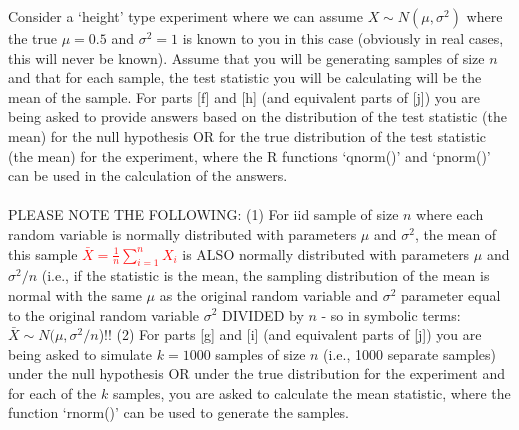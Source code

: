 \documentclass[letterpaper, 11pt]{article}
\begin{document}
Consider a `height' type experiment where we can assume $X \sim N(\mu, \sigma^2)$ where the true $\mu=0.5$ and $\sigma^2=1$ is known to you in this case (obviously in real cases, this will never be known).  Assume that you will be generating samples of size $n$ and that for each sample, the test statistic you will be calculating will be the mean of the sample.  For parts [f] and [h] (and equivalent parts of [j]) you are being asked to provide answers based on the distribution of the test statistic (the mean) for the null hypothesis OR for the true distribution of the test statistic (the mean) for the experiment, where the R functions `qnorm()' and `pnorm()' can be used in the calculation of the answers.
\\
\\
PLEASE NOTE THE FOLLOWING: (1) For iid sample of size $n$ where each random variable is normally distributed with parameters $\mu$ and $\sigma^2$, the mean of this sample \textcolor{red}{$\bar{X} = \frac{1}{n}\sum_{i=1}^n X_i$} is ALSO normally distributed with parameters $\mu$ and $\sigma^2/n$ (i.e., if the statistic is the mean, the sampling distribution of the mean is normal with the same $\mu$ as the original random variable and $\sigma^2$ parameter equal to the original random variable $\sigma^2$ DIVIDED by $n$ - so in symbolic terms: $\bar{X} \sim N(\mu, \sigma^2 / n$)!! (2) For parts [g] and [i] (and equivalent parts of [j]) you are being asked to simulate $k=1000$ samples of size $n$ (i.e., 1000 separate samples) under the null hypothesis OR under the true distribution for the experiment and for each of the $k$ samples, you are asked to calculate the mean statistic, where the function `rnorm()' can be used to generate the samples.  
\end{document}
